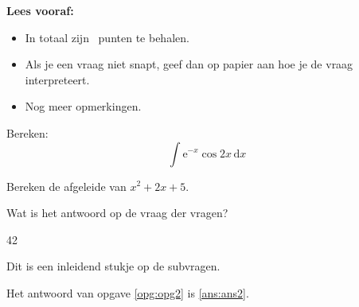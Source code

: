 \documentclass[12pt,english,addpoints]{tisdexam}
\begin{document}
\makecoverpage


\textbf{Lees vooraf:}
\begin{itemize}
\item In totaal zijn \numpoints\ punten te behalen.
\item Als je een vraag niet snapt, geef dan op papier aan hoe je de vraag interpreteert.
\item Nog meer opmerkingen.
\end{itemize}

\hrulefill

\begin{questions}


\question[5]
Bereken: \[\int \mathrm{e}^{-x}\cos 2x \, \mathrm{d}x\]

\question[5]
Bereken de afgeleide van $x^2+2x+5$.

\question[2]
\label{opg:opg2}
Wat is het antwoord op de vraag der vragen?
\begin{choices}
\CorrectChoice \label{ans:ans2} 42
\end{choices}

\question
Dit is een inleidend stukje op de subvragen.

\end{questions}

\hrulefill

Het antwoord van opgave \ref{opg:opg2} is \ref{ans:ans2}.
\end{document}
